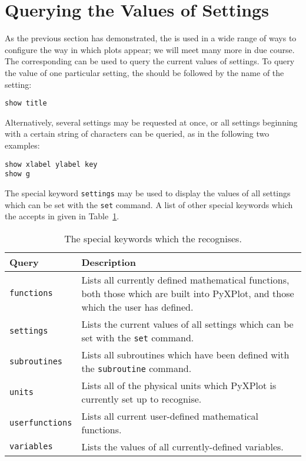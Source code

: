 \section{Querying the Values of Settings}

As the previous section has demonstrated, the  is used in a wide
range of ways to configure the way in which plots appear; we will meet many
more in due course. The corresponding  can be used to query the
current values of settings. To query the value of one particular setting, the
 should be followed by the name of the setting:

\begin{verbatim}
show title
\end{verbatim}

\noindent Alternatively, several settings may be requested at once, or all
settings beginning with a certain string of characters can be queried, as in
the following two examples:

\begin{verbatim}
show xlabel ylabel key
show g
\end{verbatim}

\noindent The special keyword {\tt settings} may be used to display the values
of all settings which can be set with the {\tt set} command. A list of other
special keywords which the  accepts in given in
Table~\ref{tab:show_keywords}.

\begin{table}
\begin{center}
\begin{tabular}{|lp{9cm}|}
\hline
{\bf Query} & {\bf Description} \\ \hline
{\tt functions} & Lists all currently defined mathematical functions, both those which are built into PyXPlot, and those which the user has defined.\\
{\tt settings} & Lists the current values of all settings which can be set with the {\tt set} command.\\
{\tt subroutines} & Lists all subroutines which have been defined with the {\tt subroutine} command.\\
{\tt units} & Lists all of the physical units which PyXPlot is currently set up to recognise.\\
{\tt userfunctions} & Lists all current user-defined mathematical functions.\\
{\tt variables} & Lists the values of all currently-defined variables.\\
\hline
\end{tabular}
\end{center}
\caption{The special keywords which the  recognises.}
\label{tab:show_keywords}
\end{table}

